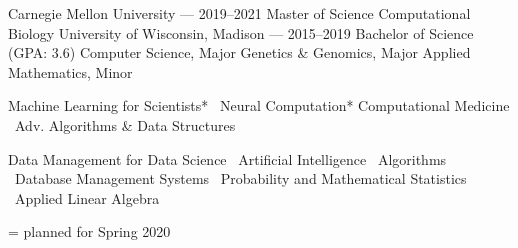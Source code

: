 \documentclass[10pt, letterpaper]{awesome-cv}
\begin{document}
\makecvheader
\begin{minipage}[t]{0.5\textwidth}
\begin{cventries}
    \cvgrad
        {Carnegie Mellon University --- \normalsize{2019--2021}}
        {Master of Science}
        {Computational Biology}
    \cvundergrad
        {University of Wisconsin, Madison --- \normalsize{2015--2019}}
        {Bachelor of Science (GPA: 3.6)}
        {Computer Science, Major}
        {Genetics \& Genomics, Major}
        {Applied Mathematics, Minor}
\end{cventries}
\end{minipage}
\begin{minipage}[t]{0.5\textwidth}
\newcommand{\sep}{\textbar \ }
\cvsectionline \bodyfont 
{}
Machine Learning for Scientists*
\sep Neural Computation*
 Computational Medicine
\sep Adv. Algorithms \& Data Structures

\vspace*{2em}
Data Management for Data Science 
\sep Artificial Intelligence 
\sep Algorithms 
\sep Database Management Systems 
\sep Probability and Mathematical Statistics
\sep Applied Linear Algebra

\vspace*{0.5em}
\begin{flushright}
    \small * = planned for Spring 2020
\end{flushright}
\vspace*{-2em}
\end{minipage}
\end{document}
